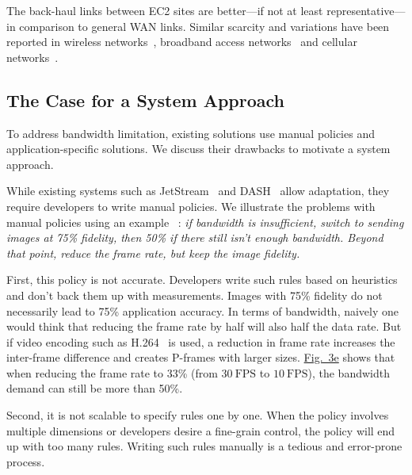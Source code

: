 The back-haul links between EC2 sites are better---if not at least
representative---in comparison to general WAN links. Similar scarcity and
variations have been reported in wireless networks~\cite{biswas2015large},
broadband access networks~\cite{grover2013peeking, sundaresan2014bismark} and
cellular networks~\cite{nikravesh2014mobile}. 

\subsection{The Case for a System Approach}
\label{sec:making-case-sys-approach}

To address bandwidth limitation, existing solutions use manual policies and
application-specific solutions. We discuss their drawbacks to motivate a system
approach. 

 While existing systems such as
JetStream~\cite{rabkin2014aggregation} and DASH~\cite{sodagar2011mpeg}  allow
adaptation, they require developers to write manual policies. We illustrate the
problems with manual policies using an example~\cite{rabkin2014aggregation} :
\textit{if bandwidth is insufficient, switch to sending images at 75\% fidelity,
  then 50\% if there still isn't enough bandwidth. Beyond that point, reduce the
  frame rate, but keep the image fidelity.}

First, this policy is not accurate.  Developers write such rules based on
heuristics and don't back them up with measurements. Images with 75\% fidelity
do not necessarily lead to 75\% application accuracy. In terms of bandwidth,
naively one would think that reducing the frame rate by half will also half the
data rate. But if video encoding such as H.264~\cite{richardson2011h} is used, a
reduction in frame rate increases the inter-frame difference and creates
P-frames with larger sizes. \hyperref[fig:app-specific]{Fig.~3e} shows that when
reducing the frame rate to 33\% (from \(30~\text{FPS}\) to \(10~\text{FPS}\)),
the bandwidth demand can still be more than 50\%.

Second, it is not scalable to specify rules one by one. When the policy involves
multiple dimensions or developers desire a fine-grain control, the policy will
end up with too many rules.  Writing such rules manually is a tedious and
error-prone process. 

